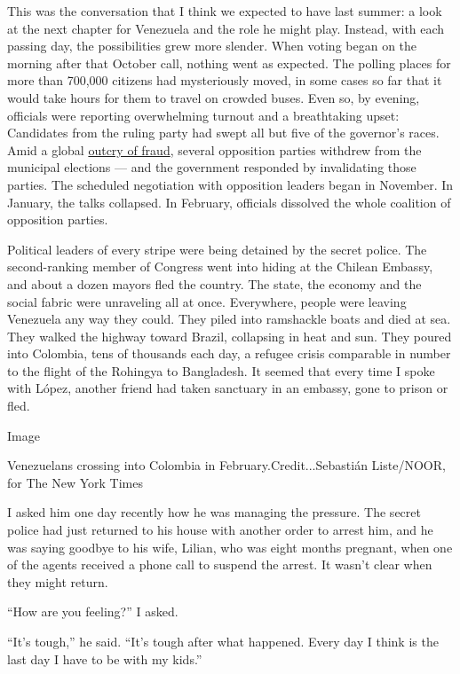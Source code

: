 This was the conversation that I think we expected to have last summer:
a look at the next chapter for Venezuela and the role he might play.
Instead, with each passing day, the possibilities grew more slender.
When voting began on the morning after that October call, nothing went
as expected. The polling places for more than 700,000 citizens had
mysteriously moved, in some cases so far that it would take hours for
them to travel on crowded buses. Even so, by evening, officials were
reporting overwhelming turnout and a breathtaking upset: Candidates from
the ruling party had swept all but five of the governor's races. Amid a
global
\href{https://www.wsj.com/articles/venezuelas-latest-election-fraud-1508106069}{outcry
of fraud}, several opposition parties withdrew from the municipal
elections --- and the government responded by invalidating those
parties. The scheduled negotiation with opposition leaders began in
November. In January, the talks collapsed. In February, officials
dissolved the whole coalition of opposition parties.

Political leaders of every stripe were being detained by the secret
police. The second-ranking member of Congress went into hiding at the
Chilean Embassy, and about a dozen mayors fled the country. The state,
the economy and the social fabric were unraveling all at once.
Everywhere, people were leaving Venezuela any way they could. They piled
into ramshackle boats and died at sea. They walked the highway toward
Brazil, collapsing in heat and sun. They poured into Colombia, tens of
thousands each day, a refugee crisis comparable in number to the flight
of the Rohingya to Bangladesh. It seemed that every time I spoke with
López, another friend had taken sanctuary in an embassy, gone to prison
or fled.

Image

Venezuelans crossing into Colombia in February.Credit...Sebastián
Liste/NOOR, for The New York Times

I asked him one day recently how he was managing the pressure. The
secret police had just returned to his house with another order to
arrest him, and he was saying goodbye to his wife, Lilian, who was eight
months pregnant, when one of the agents received a phone call to suspend
the arrest. It wasn't clear when they might return.

``How are you feeling?'' I asked.

``It's tough,'' he said. ``It's tough after what happened. Every day I
think is the last day I have to be with my kids.''

